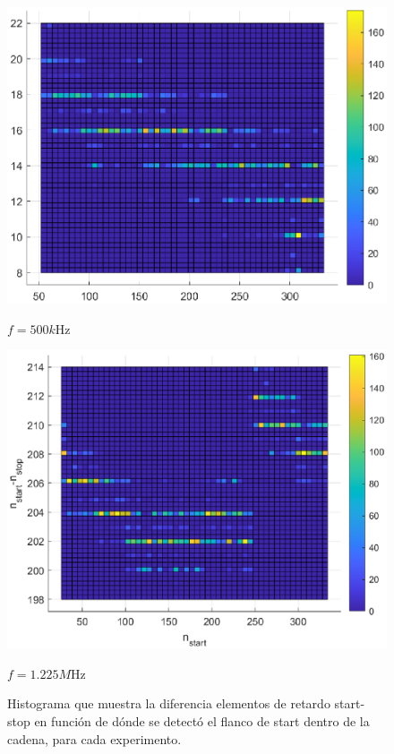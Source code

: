 \begin{figure}[H]
     \vspace{0.5cm} %
     
     \begin{minipage}{0.45\textwidth}
         \centering
         \includegraphics[width=\textwidth]{imagenes/start-stop_500k.eps} %
         \caption{$f = 500k$Hz}
     \end{minipage}\hfill
     \begin{minipage}{0.45\textwidth}
         \centering
         \includegraphics[width=\textwidth]{imagenes/start-stop_1225M.eps} %
         \caption{$f = 1.225M$Hz}
     \end{minipage}
     \caption{Histograma que muestra la diferencia elementos de retardo start-stop en función
          de dónde se detectó el flanco de start dentro de la cadena, para cada experimento.}
\end{figure}

